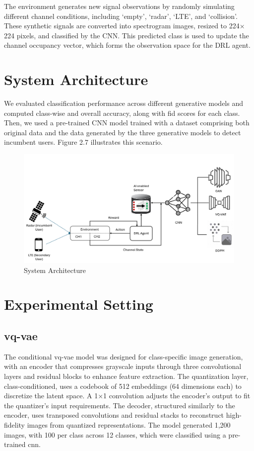 The environment generates new signal observations by randomly simulating different channel conditions, including ‘empty’, ‘radar’, ‘LTE’, and ‘collision’. These synthetic signals are converted into spectrogram images, resized to 224$\times$224 pixels, and classified by the CNN. This predicted class is used to update the channel occupancy vector, which forms the observation space for the DRL agent.
\section{System Architecture}

We evaluated classification performance across different generative models and computed class-wise and overall accuracy, along with \gls{fid} scores for each class. Then, we used a pre-trained CNN model trained with a dataset comprising both original data and the data generated by the three generative models to detect incumbent users. Figure 2.7 illustrates this scenario.
\begin{figure}[h]
\includegraphics[width=\textwidth]{figures/system-architecture.png}
\centering
\caption{ System Architecture}
\centering
\end{figure}

\section{Experimental Setting}
\subsection{\gls{vq-vae}}
The conditional \gls{vq-vae} model was designed for class-specific image generation, with an encoder that compresses grayscale inputs through three convolutional layers and residual blocks to enhance feature extraction. The quantization layer, class-conditioned, uses a codebook of 512 embeddings (64 dimensions each) to discretize the latent space. A 1×1 convolution adjusts the encoder's output to fit the quantizer's input requirements. The decoder, structured similarly to the encoder, uses transposed convolutions and residual stacks to reconstruct high-fidelity images from quantized representations. The model generated 1,200 images, with 100 per class across 12 classes, which were classified using a pre-trained \gls{cnn}.

